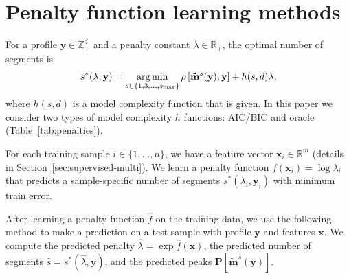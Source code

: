\documentclass{article}
\DeclareMathOperator*{\argmin}{arg\,min}
\newcommand{\ZZ}{\mathbb Z}
\newcommand{\RR}{\mathbb R}
\begin{document}



\section{Penalty function learning methods}
\label{sec:penalty-learning}

For a profile $\mathbf y\in\ZZ_+^d$ and a penalty constant $\lambda\in\RR_+$, the
optimal number of segments is
\begin{equation}
  \label{eq:optimal_segments}
  s^*(\lambda, \mathbf y) =
  \argmin_{s\in\{1,3,\dots, s_{\text{\text{max}}}\}}
  \rho\left[
    \mathbf{\tilde m}^s(\mathbf y),
    \mathbf y
  \right]
  + h(s, d) \lambda,
\end{equation}
where $h(s, d)$ is a model complexity function that is given. In
this paper we consider two types of model complexity $h$ functions:
AIC/BIC and oracle (Table~\ref{tab:penalties}). 

For each training sample $i\in\{1,\dots, n\}$, we have a feature
vector $\mathbf x_i\in\RR^m$ (details in
Section~\ref{sec:supervised-multi}). We learn a penalty function
$f(\mathbf x_i) = \log \lambda_i$ that predicts a sample-specific
number of segments $s^*(\lambda_i, \mathbf y_i)$ with minimum train
error.

After learning a penalty function $\hat f$ on the training
data, we use the following method to make a prediction on a test
sample with profile $\mathbf y$ and features $\mathbf x$. We compute
the predicted penalty $\hat \lambda = \exp \hat f(\mathbf x)$, the
predicted number of segments $\hat s = s^*(\hat \lambda, \mathbf y)$,
and the predicted peaks $\mathbf P\left[ \mathbf{\tilde
    m}^{\hat s}(\mathbf y) \right]$.
\end{document}
